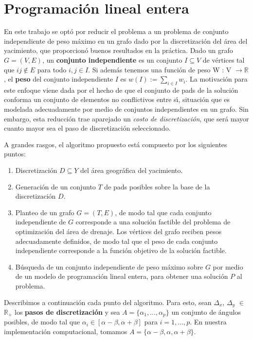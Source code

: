 \newpage
\section{Programaci\'on lineal entera}

En este trabajo se opt\'o por reducir el problema a un problema de conjunto independiente de peso m\'aximo en un grafo dado por la discretizaci\'on del \'area del yacimiento, que proporcion\'o buenos resultados en la pr\'actica. Dado un grafo $G=(V,E)$, un \textbf{conjunto independiente} es un conjunto $I\subseteq V$ de v\'ertices tal que $ij\not\in E$ para todo $i,j\in I$. Si adem\'as tenemos una funci\'on de peso W : V $\rightarrow \mathbb{R}$, el \textbf{peso} del conjunto independiente $I$ es $w(I) := \sum_{i\in I} w_i$. La motivaci\'on para este enfoque viene dada por el hecho de que el conjunto de pads de la soluci\'on conforma un conjunto de elementos no conflictivos entre s\'\i, situaci\'on que es modelada adecuadamente por medio de conjuntos independientes en un grafo. Sin embargo, esta reducci\'on trae aparejado un \emph{costo de discretizaci\'on}, que ser\'a mayor cuanto mayor sea el paso de discretizaci\'on seleccionado.

A grandes rasgos, el algoritmo propuesto est\'a compuesto por los siguientes puntos:
\begin{enumerate}
\item Discretizaci\'on $D\subseteq Y$ del \'area geogr\'afica del yacimiento.
\item Generaci\'on de un conjunto $T$ de pads posibles sobre la base de la discretizaci\'on $D$.
\item Planteo de un grafo $G=(T,E)$, de modo tal que cada conjunto independiente de $G$ corresponde a una soluci\'on factible del problema de optimizaci\'on del \'area de drenaje. Los v\'ertices del grafo reciben pesos adecuadamente definidos, de modo tal que el peso de cada conjunto independiente corresponde a la funci\'on objetivo de la soluci\'on factible.
\item B\'usqueda de un conjunto independiente de peso m\'aximo sobre $G$ por medio de un modelo de programaci\'on lineal entera, para obtener una soluci\'on $P$ al problema.
\end{enumerate}
Describimos a continuaci\'on cada punto del algoritmo. Para esto, sean $\Delta_x$, $\Delta_y$ $\in$ $\mathbb{R}_{+}$ los \textbf{pasos de discretizaci\'on} y sea $A=\{\alpha_1,\dots,\alpha_p\}$ un conjunto de \'angulos posibles, de modo tal que $\alpha_i\in[\alpha-\beta,\alpha+\beta]$ para $i=1,\dots,p$. En nuestra implementaci\'on computacional, tomamos $A=\{\alpha-\beta,\alpha,\alpha+\beta\}$.


